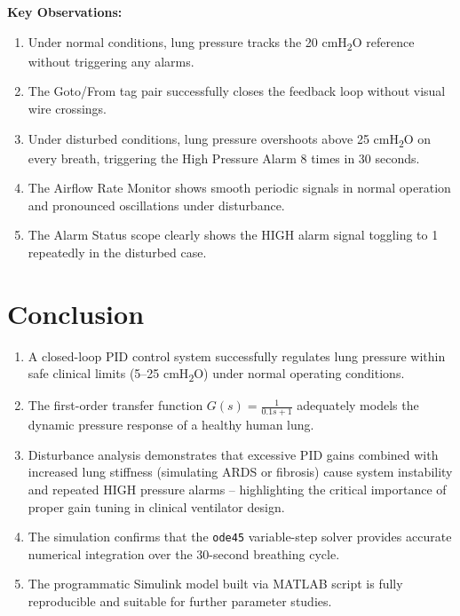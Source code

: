 \documentclass[12pt,a4paper]{article}
\begin{document}
\textbf{Key Observations:}
\begin{enumerate}
  \item Under normal conditions, lung pressure tracks the 20 cmH\textsubscript{2}O reference without triggering any alarms.
  \item The Goto/From tag pair successfully closes the feedback loop without visual wire crossings.
  \item Under disturbed conditions, lung pressure overshoots above 25 cmH\textsubscript{2}O on every breath, triggering the High Pressure Alarm 8 times in 30 seconds.
  \item The Airflow Rate Monitor shows smooth periodic signals in normal operation and pronounced oscillations under disturbance.
  \item The Alarm Status scope clearly shows the HIGH alarm signal toggling to 1 repeatedly in the disturbed case.
\end{enumerate}

\section{Conclusion}

\begin{enumerate}
  \item A closed-loop PID control system successfully regulates lung pressure within safe clinical limits (5--25 cmH\textsubscript{2}O) under normal operating conditions.
  \item The first-order transfer function $G(s)=\frac{1}{0.1s+1}$ adequately models the dynamic pressure response of a healthy human lung.
  \item Disturbance analysis demonstrates that excessive PID gains combined with increased lung stiffness (simulating ARDS or fibrosis) cause system instability and repeated HIGH pressure alarms -- highlighting the critical importance of proper gain tuning in clinical ventilator design.
  \item The simulation confirms that the \texttt{ode45} variable-step solver provides accurate numerical integration over the 30-second breathing cycle.
  \item The programmatic Simulink model built via MATLAB script is fully reproducible and suitable for further parameter studies.
\end{enumerate}
\end{document}
